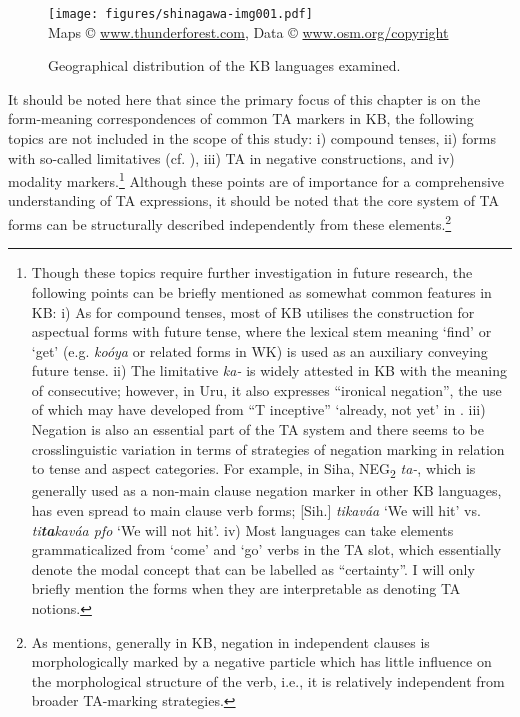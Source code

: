 \documentclass[output=paper]{langscibook}
\begin{document}
 
\begin{figure}
\texttt{[image: figures/shinagawa-img001.pdf]}
\\ {\tiny Maps © \url{www.thunderforest.com}, Data © \url{www.osm.org/copyright}}
\caption{Geographical distribution of the KB languages examined.}
\label{map:shinagawa:1}
\end{figure}

\largerpage
  It should be noted here that since the primary focus of this chapter is on the form-meaning correspondences of common TA markers in KB, the following topics are not included in the scope of this study: i) compound tenses, ii) forms with so-called limitatives (cf. \citealt{Meeussen1967}), iii) TA in negative constructions, and iv) modality markers.\footnote{Though these topics require further investigation in future research, the following points can be briefly mentioned as somewhat common features in KB: i) As for compound tenses, most of KB utilises the construction for aspectual forms with future tense, where the lexical stem meaning ‘find’ or ‘get’ (e.g. \textit{koóya} or related forms in WK) is used as an auxiliary conveying future tense. ii) The limitative \textit{ka-} is widely attested in KB with the meaning of consecutive; however, in Uru, it also expresses “ironical negation”, the use of which may have developed from “T inceptive” `already, not yet' in \citet[109]{Meeussen1967}. iii) Negation is also an essential part of the TA system and there seems to be crosslinguistic variation in terms of strategies of negation marking in relation to tense and aspect categories. For example, in Siha, NEG\textsubscript{2} \textit{ta-}, which is generally used as a non-main clause negation marker in other KB languages, has even spread to main clause verb forms; [Sih.] \textit{tikaváa} `We will hit' vs. \textit{ti}\textbf{\textit{ta}}\textit{kaváa pfo} `We will not hit'. iv) Most languages can take elements grammaticalized from ‘come’ and ‘go’ verbs in the TA slot, which essentially denote the modal concept that can be labelled as “certainty”. I will only briefly mention the forms when they are interpretable as denoting TA notions.} Although these points are of importance for a comprehensive understanding of TA expressions, it should be noted that the core system of TA forms can be structurally described independently from these elements.\footnote{As \citet[73]{Nurse2003a} mentions, generally in KB, negation in independent clauses is morphologically marked by a negative particle which has little influence on the morphological structure of the verb, i.e., it is relatively independent from broader TA-marking strategies.}
\end{document}

